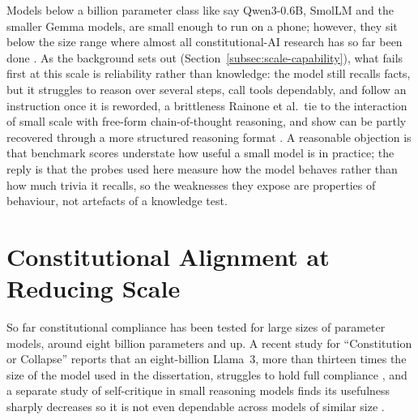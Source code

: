 Models below a billion parameter class like say Qwen3-0.6B, SmolLM and the smaller Gemma models, are small enough to run on a phone; however, they sit below the size range where almost all constitutional-AI research has so far been done \cite{yang2025qwen3technicalreport, thawakar2024mobillamaaccuratelightweightfully}. As the background sets out (Section~\ref{subsec:scale-capability}), what fails first at this scale is reliability rather than knowledge: the model still recalls facts, but it struggles to reason over several steps, call tools dependably, and follow an instruction once it is reworded, a brittleness Rainone et al.\ tie to the interaction of small scale with free-form chain-of-thought reasoning, and show can be partly recovered through a more structured reasoning format \cite{rainone2025replacingthinkingtoolusage}. A reasonable objection is that benchmark scores understate how useful a small model is in practice; the reply is that the probes used here measure how the model behaves rather than how much trivia it recalls, so the weaknesses they expose are properties of behaviour, not artefacts of a knowledge test.

\section{Constitutional Alignment at Reducing Scale}
\label{sec:sota-cai-scale}

So far constitutional compliance has been tested for large sizes of parameter models, around eight billion parameters and up. A recent study for ``Constitution or Collapse'' reports that an eight-billion Llama~3, more than thirteen times the size of the model used in the dissertation, struggles to hold full compliance \cite{zhang2025constitutioncollapseexploringconstitutional}, and a separate study of self-critique in small reasoning models finds its usefulness sharply decreases so it is not even dependable across models of similar size \cite{menke2025effectiveconstitutionalaismall}.

